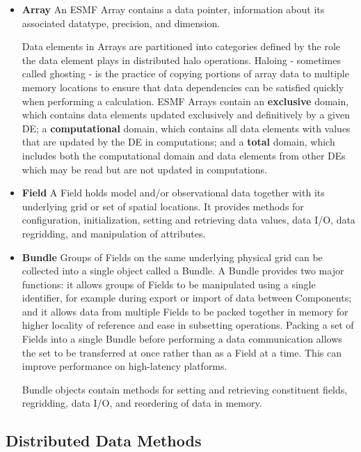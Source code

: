 \begin{itemize}

\item {\bf Array}  An ESMF Array contains a data pointer, 
information about its associated datatype, precision, and 
dimension.  

Data elements in Arrays are partitioned into categories 
defined by the role the data element plays in distributed halo 
operations.  Haloing - sometimes called ghosting - is the 
practice of copying portions of array data to multiple memory 
locations to ensure that data dependencies can be satisfied 
quickly when performing a calculation.  ESMF Arrays contain 
an {\bf exclusive} domain, which contains data elements
updated exclusively and definitively by a given DE; a 
{\bf computational} domain, which contains all data elements
with values that are updated by the DE in computations; and 
a {\bf total} domain, which includes both the computational 
domain and data elements from other DEs which may be read 
but are not updated in computations.

\item {\bf Field}  A Field holds model and/or observational 
data together with its underlying grid or set of spatial 
locations.  It provides methods for configuration, 
initialization, setting and retrieving data values, 
data I/O, data regridding, and manipulation of attributes.

\item {\bf Bundle} Groups of Fields on the same underlying 
physical grid can be collected into a single object called a Bundle.  
A Bundle provides two major functions: it allows groups of 
Fields to be manipulated using a single identifier, for example 
during export or import of data between Components; and 
it allows data from multiple Fields to be packed together 
in memory for higher locality of reference and ease in 
subsetting operations.  Packing a set of Fields into a single
Bundle before performing a data communication allows the set 
to be transferred at once rather than as a Field at a time.
This can improve performance on high-latency platforms.

Bundle objects contain methods for setting and retrieving constituent 
fields, regridding, data I/O, and reordering of data in memory.

\end{itemize}

\subsection{Distributed Data Methods}

